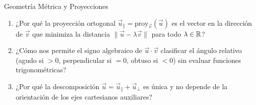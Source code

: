 \documentclass[10pt,aspectratio=169]{beamer}
\begin{document}
\begin{frame}{Geometría Métrica y Proyecciones}
  \vspace{0.2cm}
  \small
  \begin{enumerate}\itemsep14pt
    \item ¿Por qué la proyección ortogonal $\vec{u}_\parallel = \text{proy}_{\vec{v}}(\vec{u})$ es el vector en la dirección de $\vec{v}$ que minimiza la distancia $\|\vec{u} - \lambda\vec{v}\|$ para todo $\lambda \in \mathbb{R}$?
    \item ¿Cómo nos permite el signo algebraico de $\vec{u}\cdot\vec{v}$ clasificar el ángulo relativo (agudo si $>0$, perpendicular si $=0$, obtuso si $<0$) sin evaluar funciones trigonométricas?
    \item ¿Por qué la descomposición $\vec{u} = \vec{u}_\parallel + \vec{u}_\perp$ es única y no depende de la orientación de los ejes cartesianos auxiliares?
  \end{enumerate}
\end{frame}
\end{document}
